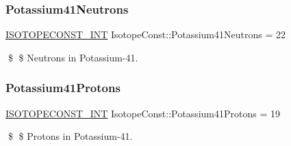 \subsubsection{\texorpdfstring{Potassium41\+Neutrons}{Potassium41Neutrons}}
{\footnotesize\ttfamily \mbox{\hyperlink{group___isotope_const-_macros_ga5f18360b3e99483a35c32d789e62621c}{I\+S\+O\+T\+O\+P\+E\+C\+O\+N\+S\+T\+\_\+\+I\+NT}} Isotope\+Const\+::\+Potassium41\+Neutrons = 22}

\$ \$ Neutrons in Potassium-\/41. \mbox{\label{group___isotope_const-_potassium-_k41_ga05c56a5d0b0aeaf0c0bd85e975dd0484}} 
\subsubsection{\texorpdfstring{Potassium41\+Protons}{Potassium41Protons}}
{\footnotesize\ttfamily \mbox{\hyperlink{group___isotope_const-_macros_ga5f18360b3e99483a35c32d789e62621c}{I\+S\+O\+T\+O\+P\+E\+C\+O\+N\+S\+T\+\_\+\+I\+NT}} Isotope\+Const\+::\+Potassium41\+Protons = 19}

\$ \$ Protons in Potassium-\/41. 
